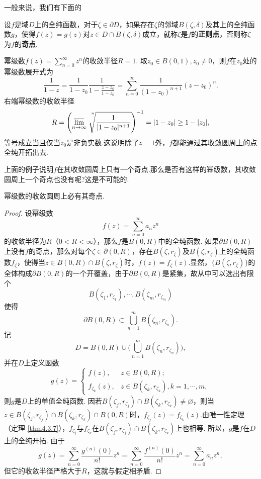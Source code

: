 一般来说，我们有下面的
\begin{definition}
设$f$是域$D$上的全纯函数，对于$\zeta\in\partial D$，如果存在$\zeta$的邻域$B(\zeta,\delta)$及其上的全纯函数$g$，使得$f(z)=g(z)$对$z\in D\cap B(\zeta,\delta)$成立，就称$\zeta$是$f$的\textbf{正则点}，否则称$\zeta$为$f$的\textbf{奇点}.
\end{definition}

\begin{example}\label{exam6.2.2}
幂级数$f(z)=\sum_{n=0}^\infty z^n$的收敛半径$R=1$. 取$z_0\in B(0,1),z_0\ne0$，则$f$在$z_0$处的幂级数展开式为
\[\frac1{1-z}=\frac1{1-z_0}\frac1{1-\frac{z-z_0}{1-z_0}}
=\sum_{n=0}^\infty\frac1{(1-z_0)^{n+1}}(z-z_0)^n.\]
右端幂级数的收敛半径
\[R=\left(\varlimsup_{n\to\infty}\sqrt[\leftroot{-4}\uproot{20}n]{\frac1{|1-z_0|^{n+1}}}
\right)^{-1}=|1-z_0|\ge1-|z_0|,\]
等号成立当且仅当$z_0$是非负实数.这说明除了$z=1$外，$f$都能通过其收敛圆周上的点全纯开拓出去.
\end{example}

上面的例子说明$f$在其收敛圆周上只有一个奇点.那么是否有这样的幂级数，其收敛圆周上一个奇点也没有呢?这是不可能的.
\begin{theorem}\label{thm6.2.3}
幂级数的收敛圆周上必有其奇点.
\end{theorem}
\begin{proof}
设幂级数
\[f(z)=\sum_{n=0}^\infty a_nz^n\]
的收敛半径为$R$（$0<R<\infty$），那么$f$是$B(0,R)$中的全纯函数.
如果$\partial B(0,R)$上没有$f$的奇点，那么对每个$\zeta\in\partial(0,R)$，存在$B(\zeta,r_\zeta)$及$B(\zeta,r_\zeta)$上的全纯函数$f_\zeta$，使得当$z\in B(0,R)\cap B(\zeta,r_\zeta)$时，$f(z)=f_\zeta(z)$.显然，$\{B(\zeta,r_\zeta)\}$的全体构成$\partial B(0,R)$的一个开覆盖，由于$\partial B(0,R)$是紧集，故从中可以选出有限个
\[B(\zeta_1,r_{\zeta_1}),\cdots,B(\zeta_m,r_{\zeta_m})\]
使得
\[\partial B(0,R)\subset\bigcup_{n=1}^m B(\zeta_n,r_{\zeta_n}).\]
记
\[D=B(0,R)\cup\big(\bigcup_{n=1}^mB(\zeta_n,r_{\zeta_n})\big),\]
并在$D$上定义函数
\[g(z)=\begin{cases}
f(z),&z\in B(0,R);\\
f_{\zeta_k}(z),&z\in B(\zeta_k,r_{\zeta_k}),k=1,\cdots,m,
\end{cases}\]
则$g$是$D$上的单值全纯函数. 因若$B(\zeta_j,r_{\zeta_j})\cap B(\zeta_k,r_{\zeta_k})
\ne\varnothing$，则当$z\in B(\zeta_j,r_{\zeta_j})\cap B(\zeta_k,r_{\zeta_k})\cap B(0,R)$时，$f_{\zeta_j}(z)=f_{\zeta_k}(z)$.由唯一性定理（定理 \ref{thm4.3.7}），$f_{\zeta_j}$与$f_{\zeta_k}$在$B(\zeta_j,r_{\zeta_j})\cap B(\zeta_k,r_{\zeta_k})$上也相等. 所以，$g$是$f$在$D$上的全纯开拓. 由于
\[g(z)=\sum_{n=0}^\infty \frac{g^{(n)}(0)}{n!}z^n=\sum_{n=0}^\infty
\frac{f^{(n)}(0)}{n!}z^n=\sum_{n=0}^\infty a_nz^n,\]
但它的收敛半径严格大于$R$，这就与假定相矛盾.
\end{proof}

